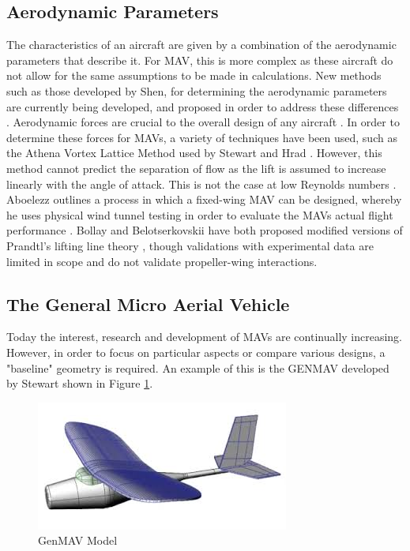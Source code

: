 \subsection{Aerodynamic Parameters}
\label{sec:AerodynamicParameters}
The characteristics of an aircraft are given by a combination of the aerodynamic parameters that describe it. For MAV, this is more complex as these aircraft do not allow for the same assumptions to be made in calculations. New methods such as those developed by Shen, for determining the aerodynamic parameters are currently being developed, and proposed in order to address these differences \cite{Shen2018} \cite{Roberts2011}. Aerodynamic forces are crucial to the overall design of any aircraft \cite{Aero2012}. In order to determine these forces for MAVs, a variety of techniques have been used, such as the Athena Vortex Lattice Method used by Stewart and Hrad \cite{Stewart2007} \cite{Hrad2010}. However, this method cannot predict the separation of flow as the lift is assumed to increase linearly with the angle of attack.  This is not the case at low Reynolds numbers \cite{Zhang2022}. Aboelezz outlines a process in which a fixed-wing MAV can be designed, whereby he uses physical wind tunnel testing in order to evaluate the MAVs actual flight performance \cite{Aboelezz2020}. Bollay and Belotserkovskii have both proposed modified versions of Prandtl's lifting line theory \cite{Bollay1939} \cite{Belotserkovskii1968}, though validations with experimental data are limited in scope and do not validate propeller-wing interactions.

\subsection{The General Micro Aerial Vehicle}
\label{subsec:GenMAV}
Today the interest, research and development of MAVs are continually increasing. However, in order to focus on particular aspects or compare various designs, a "baseline" geometry is required. An example of this is the GENMAV developed by Stewart\cite{Stewart2007} shown in Figure \ref{fig:genmav2}.

\begin{figure}[H]
    \centering
    \includegraphics[width=0.8\linewidth]{04_Progress/Figs/genMav.jpeg}
    \caption{GenMAV Model \cite{Stewart2007}}
    \label{fig:genmav2}
\end{figure}

